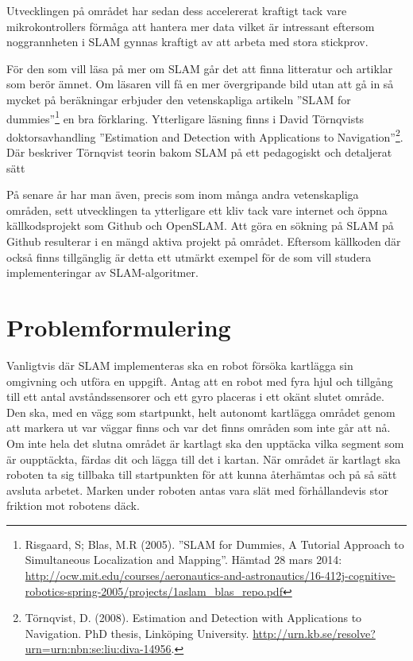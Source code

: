 \documentclass[a4paper,12pt,fleqn]{article}
\begin{document}
Utvecklingen på området har sedan dess accelererat kraftigt tack vare
mikrokontrollers förmåga att hantera mer data vilket är intressant eftersom noggrannheten i SLAM gynnas kraftigt av att arbeta med stora stickprov. 

För den som vill läsa på mer om SLAM går det att finna litteratur och artiklar som berör ämnet. Om läsaren vill få en mer övergripande bild utan att gå in så mycket på beräkningar erbjuder den vetenskapliga artikeln ''SLAM for dummies''\footnote{Risgaard, S; Blas, M.R (2005).
''SLAM for Dummies, A Tutorial Approach to Simultaneous Localization and Mapping''. 
Hämtad 28 mars 2014:
\url{http://ocw.mit.edu/courses/aeronautics-and-astronautics/16-412j-cognitive-robotics-spring-2005/projects/1aslam_blas_repo.pdf}
} en bra förklaring. Ytterligare läsning finns i David Törnqvists doktorsavhandling ''Estimation and Detection with Applications to Navigation''\footnote{Törnqvist, D. (2008). Estimation and Detection with Applications to Navigation. PhD thesis, Linköping University. \url{http://urn.kb.se/resolve?urn=urn:nbn:se:liu:diva-14956}.}. Där beskriver Törnqvist teorin bakom SLAM på ett pedagogiskt och detaljerat sätt 
 
På senare år har man även, precis som inom många andra vetenskapliga områden, sett utvecklingen ta ytterligare ett kliv tack vare internet och öppna källkodsprojekt som Github och OpenSLAM. Att göra en sökning på SLAM på Github resulterar i en mängd aktiva projekt på området. Eftersom källkoden där också finns tillgänglig är detta ett utmärkt exempel för de som vill studera implementeringar av SLAM-algoritmer. 


\section{Problemformulering}

Vanligtvis där SLAM implementeras ska en robot försöka kartlägga sin omgivning och utföra en uppgift. Antag att en robot med fyra hjul och tillgång till ett antal avståndssensorer och ett gyro placeras i ett okänt slutet område. Den ska, med en vägg som startpunkt, helt autonomt kartlägga området genom att markera ut var väggar finns och var det finns områden som inte går att nå. Om inte hela det slutna området är kartlagt ska den upptäcka vilka segment som är oupptäckta, färdas dit och lägga till det i kartan. När området är kartlagt ska roboten ta sig tillbaka till startpunkten för att kunna återhämtas och på så sätt avsluta arbetet. Marken under roboten antas vara slät med förhållandevis stor friktion mot robotens däck. 
\end{document}
